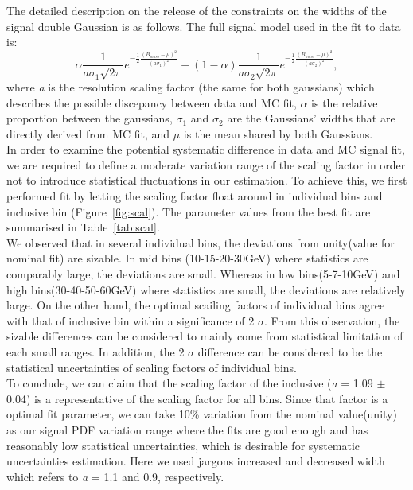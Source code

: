 The detailed description on the release of the constraints on the widths of the signal double Gaussian is as follows.
The full signal model used in the fit to data is:
\begin{equation}
\alpha\frac{1}{a\sigma_1\sqrt{2\pi}}e^{-\frac{1}{2}\frac{{(B_{mass}-\mu)}^2}{{(a\sigma_1)}^2}}+(1-\alpha)\frac{1}{a\sigma_2\sqrt{2\pi}}e^{-\frac{1}{2}\frac{{(B_{mass}-\mu)}^2}{{(a\sigma_2)}^2}},
\label{eq:scal}
\end{equation}
where \textit{a} is the resolution scaling factor (the same for both gaussians) which describes the possible discepancy between data and MC fit, $\alpha$ is the relative proportion between the gaussians, $\sigma_1$ and $\sigma_2$ are the Gaussians' widths that are directly derived from MC fit, and $\mu$ is the mean shared by both Gaussians. \\
In order to examine the potential systematic difference in data and MC signal fit, we are required to define a moderate variation range of the scaling factor in order not to introduce statistical fluctuations in our estimation. To achieve this, we first performed fit by letting the scaling factor float around in individual \pt bins and inclusive \pt bin (Figure~\ref{fig:scal}). The parameter values from the best fit are summarised in Table~\ref{tab:scal}. \\
We observed that in several individual \pt bins, the deviations from unity(value for nominal fit) are sizable. In mid \pt bins (10-15-20-30GeV) where statistics are comparably large, the deviations are small. Whereas in low \pt bins(5-7-10GeV) and high \pt bins(30-40-50-60GeV) where statistics are small, the deviations are relatively large. On the other hand, the optimal scailing factors of individual \pt bins agree with that of inclusive \pt bin within a significance of 2 $\sigma$. From this observation, the sizable differences can be considered to mainly come from statistical limitation of each small \pt ranges. In addition, the 2 $\sigma$ difference can be considered to be the statistical uncertainties of scaling factors of individual \pt bins. \\
To conclude, we can claim that the scaling factor of the inclusive \pt (\textit{a} = 1.09 $\pm$ 0.04) is a representative of the scaling factor for all \pt bins. Since that factor is a optimal fit parameter, we can take 10\% variation from the nominal value(unity) as our signal PDF variation range where the fits are good enough and has reasonably low statistical uncertainties, which is desirable for systematic uncertainties estimation. Here we used jargons increased and decreased width which refers to \textit{a} = 1.1 and 0.9, respectively.

\clearpage


